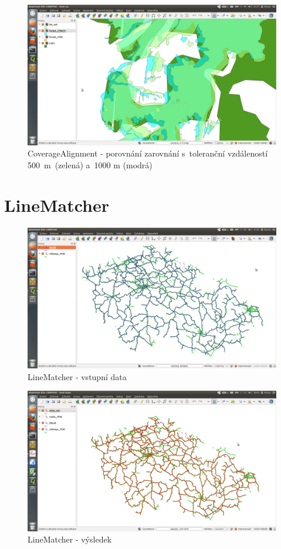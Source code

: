   \begin{figure}[H]
    \centering
      \includegraphics[width=400pt]{./pictures/test-ca4.png}
      \caption[CoverageAlignment- porovnání]{CoverageAlignment 
	- porovnání zarovnání s~toleranční vzdáleností 500~m~(zelená)
	a~1000 m (modrá)}
      \label{fig:ca4}
  \end{figure}

\section{LineMatcher}
\label{ukazky-lm}

  \begin{figure}[H]
    \centering
      \includegraphics[width=400pt]{./pictures/test-lm1.png}
      \caption{LineMatcher - vstupní data}
      \label{fig:lm1}
  \end{figure}

  \begin{figure}[H]
    \centering
      \includegraphics[width=400pt]{./pictures/test-lm2.png}
      \caption{LineMatcher - výsledek}
      \label{fig:lm2}
  \end{figure}  


